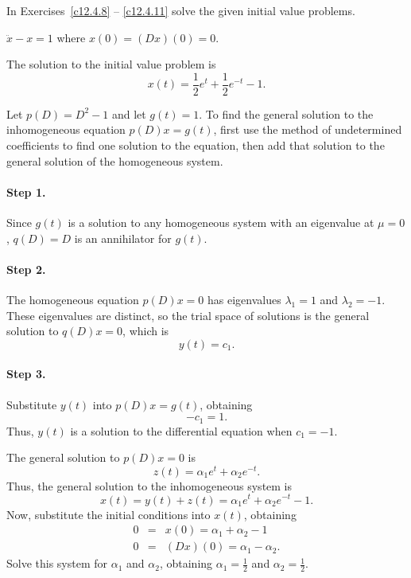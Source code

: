 \documentclass{ximera}
\begin{document}
\noindent In Exercises~\ref{c12.4.8}  -- \ref{c12.4.11} solve the given 
initial value problems.
\begin{exercise}  \label{c12.4.8}
$\ddot{x}-x = 1$ where $x(0)=(Dx)(0)=0$.

\begin{solution}
\ans The solution to the initial value problem is
\[
x(t) = \frac{1}{2}e^t + \frac{1}{2}e^{-t} - 1.
\]

\soln Let $p(D) = D^2 - 1$ and let $g(t) = 1$.  To find the general solution
to the inhomogeneous equation $p(D)x = g(t)$, first use the method of
undetermined coefficients to find one solution to the equation, then
add that solution to the general solution of the homogeneous system.

\paragraph{Step 1.} Since $g(t)$ is a solution to any homogeneous system
with an eigenvalue at $\mu = 0$, $q(D) = D$ is an annihilator for
$g(t)$.

\paragraph{Step 2.} The homogeneous equation $p(D)x = 0$ has eigenvalues
$\lambda_1 = 1$ and $\lambda_2 = -1$.  These eigenvalues are distinct,
so the trial space of solutions is the general solution to $q(D)x =
0$, which is
\[
y(t) = c_1.
\]
\paragraph{Step 3.} Substitute $y(t)$ into $p(D)x = g(t)$, obtaining
\[
-c_1 = 1.
\]
Thus, $y(t)$ is a solution to the differential equation when $c_1 = -1$.

\para The general solution to $p(D)x = 0$ is
\[
z(t) = \alpha_1e^t + \alpha_2e^{-t}.
\]
Thus, the general solution to the inhomogeneous system is
\[
x(t) = y(t) + z(t) = \alpha_1e^t + \alpha_2e^{-t} - 1.
\]
Now, substitute the initial conditions into $x(t)$, obtaining
\[
\begin{array}{rcl}
0 & = & x(0) = \alpha_1 + \alpha_2 - 1 \\
0 & = & (Dx)(0) = \alpha_1 - \alpha_2.
\end{array}
\]
Solve this system for $\alpha_1$ and $\alpha_2$, obtaining
$\alpha_1 = \frac{1}{2}$ and $\alpha_2 = \frac{1}{2}$.

\end{solution}
\end{exercise}
\end{document}
